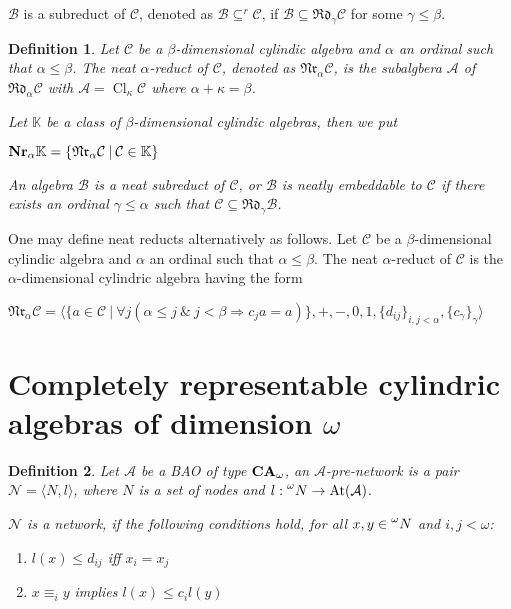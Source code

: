 \documentclass[a4paper]{article}
\theoremstyle{defin}
\newtheorem{defin}{Definition}
\theoremstyle{theorem}
\theoremstyle{prop}
\theoremstyle{lemma}
\theoremstyle{fact}
\theoremstyle{ex}
\theoremstyle{col}
\begin{document}
$\mathcal{B}$ is a subreduct of $\mathcal{C}$, denoted as $\mathcal{B} \subseteq^{r} \mathcal{C}$, if $\mathcal{B} \subseteq \mathfrak{R}\mathfrak{d}_{\gamma}\mathcal{C}$ for some $\gamma \leq \beta$.

\begin{defin}
  Let $\mathcal{C}$ be a $\beta$-dimensional cylindic algebra and $\alpha$ an ordinal such that $\alpha \leq \beta$.
  The neat $\alpha$-reduct of $\mathcal{C}$, denoted as $\mathfrak{N}\mathfrak{r}_\alpha \mathcal{C}$,
  is the subalgbera $\mathcal{A}$ of $\mathfrak{R}\mathfrak{d}_{\alpha}\mathcal{C}$ with $\mathcal{A} = \operatorname{Cl}_{\kappa} \mathcal{C}$ where $\alpha + \kappa = \beta$.

  Let $\mathbb{K}$ be a class of $\beta$-dimensional cylindic algebras, then we put
  \begin{center}
    ${\bf Nr}_{\alpha}\mathbb{K} = \{ \mathfrak{N}\mathfrak{r}_\alpha \mathcal{C} \: | \: \mathcal{C} \in \mathbb{K} \}$
  \end{center}

  An algebra $\mathcal{B}$ is a neat subreduct of $\mathcal{C}$, or $\mathcal{B}$ is neatly embeddable to $\mathcal{C}$ if there exists an ordinal $\gamma \leq \alpha$ such that
  $\mathcal{C} \subseteq \mathfrak{R}\mathfrak{d}_{\gamma}\mathcal{B}$.
\end{defin}

One may define neat reducts alternatively as follows.
Let $\mathcal{C}$ be a $\beta$-dimensional cylindic algebra and $\alpha$ an ordinal such that $\alpha \leq \beta$. The neat $\alpha$-reduct of $\mathcal{C}$ is the $\alpha$-dimensional cylindric algebra having the form

\begin{center}
  $\mathfrak{N}\mathfrak{r}_\alpha \mathcal{C} = \langle \{ a \in \mathcal{C} \: | \: \forall j (\alpha \leq j \: \& \: j < \beta \Rightarrow c_j a = a) \}, +, -, 0, 1, \{d_{ij}\}_{i,j < \alpha}, \{c_{\gamma}\}_{\gamma} \rangle$
\end{center}

\section{Completely representable cylindric algebras of dimension $\omega$}

\begin{defin}
  Let $\mathcal{A}$ be a BAO of type ${\bf CA}_{\omega}$, an $\mathcal{A}$-pre-network is a pair
  $\mathcal{N} = \langle N, l \rangle$, where $N$ is a set of nodes and $l : \prescript{\omega}{}N \to \operatorname{At}(\mathcal{A})$.

  $\mathcal{N}$ is a network, if the following conditions hold, for all $x, y \in \prescript{\omega}{}N$ and $i, j < \omega$:
  \begin{enumerate}
    \item $l(x) \leq d_{ij}$ iff $x_i = x_j$
    \item $x \equiv_i y$ implies $l(x) \leq c_i l(y)$
  \end{enumerate}
\end{defin}
\end{document}
